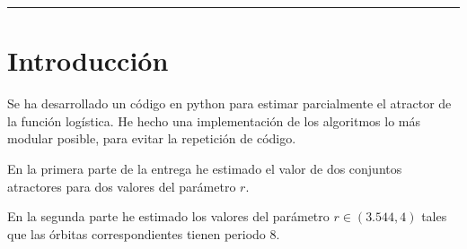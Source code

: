 \documentclass[10pt, spanish]{article}
\theoremstyle{definition}
\theoremstyle{break}
\begin{document}
 \noindent\rule{17cm}{1pt}

% 

\section{Introducción}

Se ha desarrollado un código en python para estimar parcialmente el atractor de
la función logística. He hecho una implementación de los algoritmos lo más
modular posible, para evitar la repetición de código.

En la primera parte de la entrega he estimado el valor de dos conjuntos
atractores para dos valores del parámetro $r$.

En la segunda parte he estimado los valores del parámetro $r\in(3.544,4)$ tales
que las órbitas correspondientes tienen periodo 8.

\end{document}
